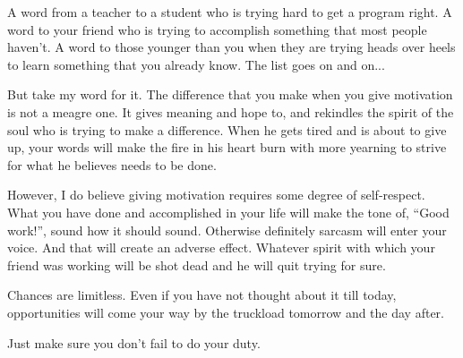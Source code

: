\documentclass[twoside,11pt,titlepage]{article}
\begin{document}
A word from a teacher to a student who is trying hard to get a program right. A word to your friend who is trying to accomplish something that most people haven't. A word to those younger than you when they are trying heads over heels to learn something that you already know. The list goes on and on...

But take my word for it. The difference that you make when you give motivation is not a meagre one. It gives meaning and hope to, and rekindles the spirit of the soul who is trying to make a difference. When he gets tired and is about to give up, your words will make the fire in his heart burn with more yearning to strive for what he believes needs to be done.

However, I do believe giving motivation requires some degree of self-respect. What you have done and accomplished in your life will make the tone of, ``Good work!'', sound how it should sound. Otherwise definitely sarcasm will enter your voice. And that will create an adverse effect. Whatever spirit with which your friend was working will be shot dead and he will quit trying for sure.

Chances are limitless. Even if you have not thought about it till today, opportunities will come your way by the truckload tomorrow and the day after.

Just make sure you don't fail to do your duty.
\end{document}
